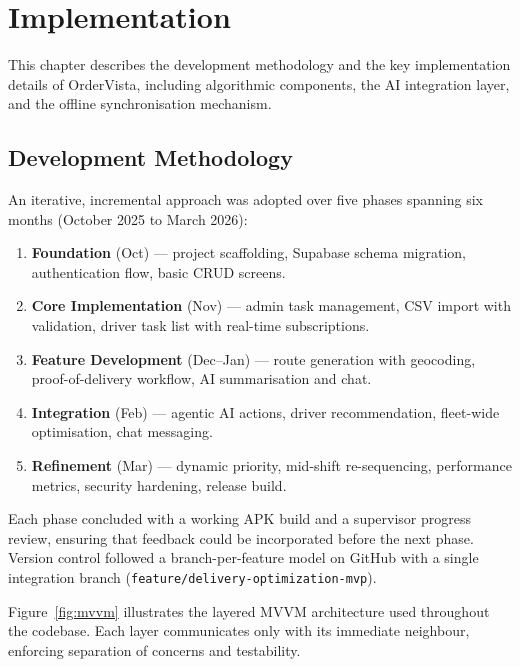 \chapter{Implementation}
\label{ch:implementation}

This chapter describes the development methodology and the key implementation
details of OrderVista, including algorithmic components, the AI integration
layer, and the offline synchronisation mechanism.

\section{Development Methodology}
\label{sec:methodology}

An iterative, incremental approach was adopted over five phases spanning six
months (October 2025 to March 2026):

\begin{enumerate}
  \item \textbf{Foundation} (Oct) — project scaffolding, Supabase schema
        migration, authentication flow, basic CRUD screens.
  \item \textbf{Core Implementation} (Nov) — admin task management, CSV import
        with validation, driver task list with real-time subscriptions.
  \item \textbf{Feature Development} (Dec--Jan) — route generation with
        geocoding, proof-of-delivery workflow, AI summarisation and chat.
  \item \textbf{Integration} (Feb) — agentic AI actions, driver
        recommendation, fleet-wide optimisation, chat messaging.
  \item \textbf{Refinement} (Mar) — dynamic priority, mid-shift
        re-sequencing, performance metrics, security hardening, release build.
\end{enumerate}

Each phase concluded with a working APK build and a supervisor progress
review, ensuring that feedback could be incorporated before the next phase.
Version control followed a branch-per-feature model on GitHub with a single
integration branch (\texttt{feature/\allowbreak delivery-optimization-mvp}).

Figure~\ref{fig:mvvm} illustrates the layered MVVM architecture used
throughout the codebase.  Each layer communicates only with its immediate
neighbour, enforcing separation of concerns and testability.

